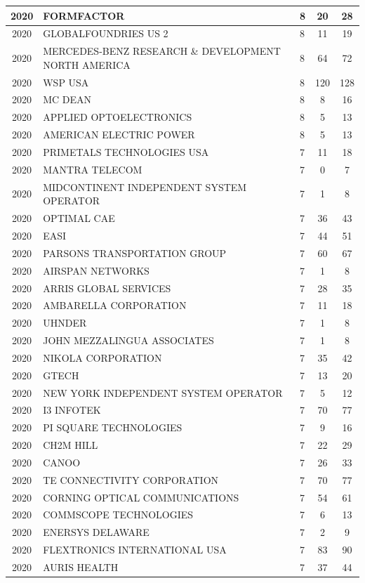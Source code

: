 \documentclass{article}%
\begin{document}
\begin{longtable}{c|p{20em}|p{5em}|c|c}
\hline%
2020&FORMFACTOR&8&20&28\\%
\hline%
2020&GLOBALFOUNDRIES US 2&8&11&19\\%
\hline%
2020&MERCEDES{-}BENZ RESEARCH \& DEVELOPMENT NORTH AMERICA&8&64&72\\%
\hline%
2020&WSP USA&8&120&128\\%
\hline%
2020&MC DEAN&8&8&16\\%
\hline%
2020&APPLIED OPTOELECTRONICS&8&5&13\\%
\hline%
2020&AMERICAN ELECTRIC POWER&8&5&13\\%
\hline%
2020&PRIMETALS TECHNOLOGIES USA&7&11&18\\%
\hline%
2020&MANTRA TELECOM&7&0&7\\%
\hline%
2020&MIDCONTINENT INDEPENDENT SYSTEM OPERATOR&7&1&8\\%
\hline%
2020&OPTIMAL CAE&7&36&43\\%
\hline%
2020&EASI&7&44&51\\%
\hline%
2020&PARSONS TRANSPORTATION GROUP&7&60&67\\%
\hline%
2020&AIRSPAN NETWORKS&7&1&8\\%
\hline%
2020&ARRIS GLOBAL SERVICES&7&28&35\\%
\hline%
2020&AMBARELLA CORPORATION&7&11&18\\%
\hline%
2020&UHNDER&7&1&8\\%
\hline%
2020&JOHN MEZZALINGUA ASSOCIATES&7&1&8\\%
\hline%
2020&NIKOLA CORPORATION&7&35&42\\%
\hline%
2020&GTECH&7&13&20\\%
\hline%
2020&NEW YORK INDEPENDENT SYSTEM OPERATOR&7&5&12\\%
\hline%
2020&I3 INFOTEK&7&70&77\\%
\hline%
2020&PI SQUARE TECHNOLOGIES&7&9&16\\%
\hline%
2020&CH2M HILL&7&22&29\\%
\hline%
2020&CANOO&7&26&33\\%
\hline%
2020&TE CONNECTIVITY CORPORATION&7&70&77\\%
\hline%
2020&CORNING OPTICAL COMMUNICATIONS&7&54&61\\%
\hline%
2020&COMMSCOPE TECHNOLOGIES&7&6&13\\%
\hline%
2020&ENERSYS DELAWARE&7&2&9\\%
\hline%
2020&FLEXTRONICS INTERNATIONAL USA&7&83&90\\%
\hline%
2020&AURIS HEALTH&7&37&44\\%
\hline%

\end{longtable}
\end{document}
